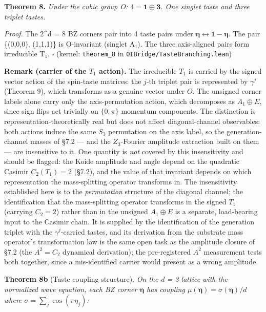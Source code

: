 \documentclass[
]{article}
\begin{document}
\textbf{Theorem 8.} \emph{Under the cubic group O:
\(4 = \mathbf{1} \oplus \mathbf{3}\). One singlet taste and three
triplet tastes.}

\emph{Proof.} The 2\^{}d = 8 BZ corners pair into 4 taste pairs under
\(\boldsymbol{\eta} \leftrightarrow \mathbf{1} - \boldsymbol{\eta}\).
The pair \{(0,0,0), (1,1,1)\} is O-invariant (singlet A₁). The three
axis-aligned pairs form irreducible T₁. \(\square\) (kernel:
\texttt{theorem\_8} in \texttt{OIBridge/TasteBranching.lean})

\textbf{Remark (carrier of the \(T_1\) action).} The irreducible \(T_1\)
is carried by the signed vector action of the spin-taste matrices: the
\(j\)-th triplet pair is represented by \(\gamma^j\) (Theorem 9), which
transforms as a genuine vector under \(O\). The unsigned corner labels
alone carry only the axis-permutation action, which decomposes as
\(A_1 \oplus E\), since sign flips act trivially on \(\{0, \pi\}\)
momentum components. The distinction is representation-theoretically
real but does not affect diagonal-channel observables: both actions
induce the same \(S_3\) permutation on the axis label, so the
generation-channel masses of §7.2 --- and the \(Z_3\)-Fourier amplitude
extraction built on them --- are insensitive to it. One quantity is
\emph{not} covered by this insensitivity and should be flagged: the
Koide amplitude and angle depend on the quadratic Casimir
\(C_2(T_1) = 2\) (§7.2), and the value of that invariant depends on
which representation the mass-splitting operator transforms in. The
insensitivity established here is to the \emph{permutation} structure of
the diagonal channel; the identification that the mass-splitting
operator transforms in the signed \(T_1\) (carrying \(C_2 = 2\)) rather
than in the unsigned \(A_1 \oplus E\) is a separate, load-bearing input
to the Casimir chain. It is supplied by the identification of the
generation triplet with the \(\gamma^j\)-carried tastes, and its
derivation from the substrate mass operator's transformation law is the
same open task as the amplitude closure of §7.2 (the \(A^2 = C_2\)
dynamical derivation); the pre-registered \(A^2\) measurement tests both
together, since a mis-identified carrier would present as a wrong
amplitude.

\textbf{Theorem 8b} (Taste coupling structure). \emph{On the d = 3
lattice with the normalized wave equation, each BZ corner
\(\boldsymbol{\eta}\) has coupling
\(\mu(\boldsymbol{\eta}) = \sigma(\boldsymbol{\eta})/d\) where
\(\sigma = \sum_j \cos(\pi\eta_j)\):}
\end{document}
